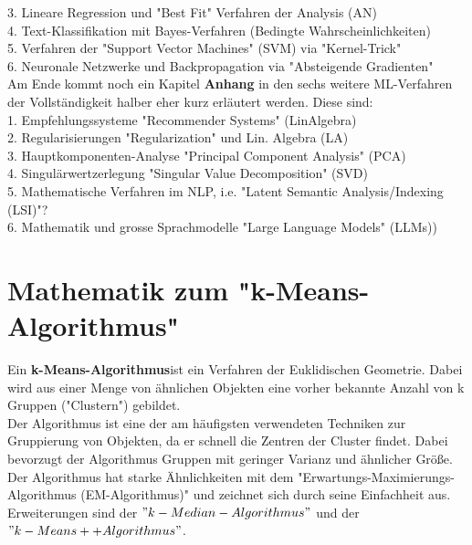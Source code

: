 \documentclass[12pt]{article}
\begin{document}
3. Lineare Regression und "Best Fit" Verfahren der Analysis (AN)\\

4. Text-Klassifikation mit Bayes-Verfahren (Bedingte Wahrscheinlichkeiten)\\
 
5. Verfahren der "Support Vector Machines" (SVM) via "Kernel-Trick"\\

6. Neuronale Netzwerke und Backpropagation via "Absteigende Gradienten"\\[0.2cm]
%
Am Ende kommt noch ein Kapitel \textbf{Anhang} in den sechs weitere ML-Verfahren der Vollständigkeit halber eher kurz erläutert werden. Diese sind:\\

1. Empfehlungssysteme "Recommender Systems" (LinAlgebra)\\

2. Regularisierungen "Regularization" und Lin. Algebra (LA)\\

3. Hauptkomponenten-Analyse "Principal Component Analysis" (PCA)\\
 
4. Singulärwertzerlegung "Singular Value Decomposition" (SVD)\\
 
5. Mathematische Verfahren im NLP, i.e. "Latent Semantic Analysis/Indexing (LSI)"?\\

6. Mathematik und grosse Sprachmodelle "Large Language Models" (LLMs))

\newpage

\section{Mathematik zum "k-Means-Algorithmus" \\}

Ein \textbf{k-Means-Algorithmus}ist ein Verfahren der Euklidischen Geometrie. Dabei wird aus einer Menge von ähnlichen Objekten eine vorher bekannte Anzahl von k Gruppen ("Clustern") gebildet.\\
Der Algorithmus ist eine der am häufigsten verwendeten Techniken zur Gruppierung von Objekten, da er schnell die Zentren der Cluster findet. Dabei bevorzugt der Algorithmus Gruppen mit geringer Varianz und ähnlicher Größe.\\
Der Algorithmus hat starke Ähnlichkeiten mit dem "Erwartungs-Maximierungs-Algorithmus (EM-Algorithmus)" und zeichnet sich durch seine Einfachheit aus.\\
Erweiterungen sind der $"k-Median-Algorithmus"$ und der $"k-Means++ Algorithmus" $.\\
\end{document}
